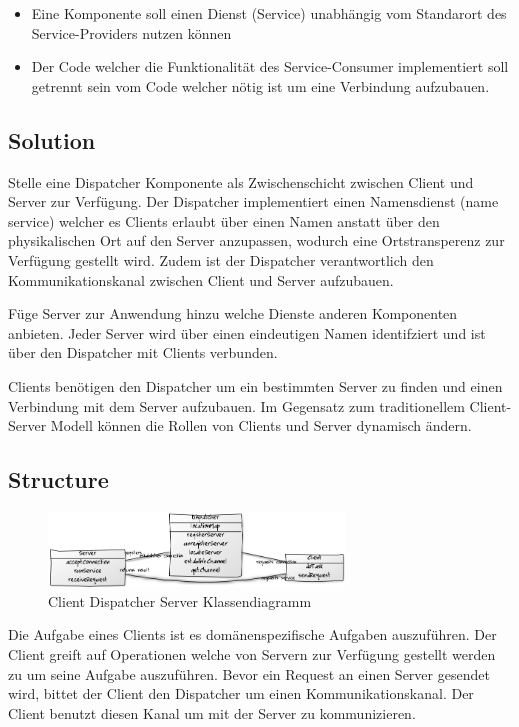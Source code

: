 \begin{itemize}
	\item Eine Komponente soll einen Dienst (Service) unabhängig vom Standarort des Service-Providers nutzen können
	\item Der Code welcher die Funktionalität des Service-Consumer implementiert soll getrennt sein vom Code welcher nötig ist um eine Verbindung aufzubauen.
\end{itemize}

\subsection*{Solution}


Stelle eine Dispatcher Komponente als Zwischenschicht zwischen Client und Server zur Verfügung. Der Dispatcher implementiert einen Namensdienst (name service) welcher es Clients erlaubt über einen Namen anstatt über den physikalischen Ort auf den Server anzupassen, wodurch eine Ortstransperenz zur Verfügung gestellt wird. Zudem ist der Dispatcher verantwortlich den Kommunikationskanal zwischen Client und Server aufzubauen.

Füge Server zur Anwendung hinzu welche Dienste anderen Komponenten anbieten. Jeder Server wird über einen eindeutigen Namen identifziert und ist über den Dispatcher mit Clients verbunden.

Clients benötigen den Dispatcher um ein bestimmten Server zu finden und einen Verbindung mit dem Server aufzubauen. Im Gegensatz zum traditionellem Client-Server Modell können die Rollen von Clients und Server dynamisch ändern.

\subsection*{Structure}

\begin{figure}[H]
	\centering
	\includegraphics[width=0.7\textwidth]{content/posa1/images/client-dispatcher-server-classes.png}
	\caption{Client Dispatcher Server Klassendiagramm}
\end{figure}


Die Aufgabe eines Clients ist es domänenspezifische Aufgaben auszuführen. Der Client greift auf Operationen welche von Servern zur Verfügung gestellt werden zu um seine Aufgabe auszuführen. Bevor ein Request an einen Server gesendet wird, bittet der Client den Dispatcher um einen Kommunikationskanal. Der Client benutzt diesen Kanal um mit der Server zu kommunizieren.

